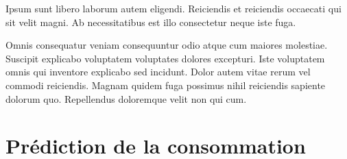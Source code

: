 \documentclass[a4paper]{article}
\begin{document}
\begin{multicols}{2}
Ipsum sunt libero laborum autem eligendi. Reiciendis et reiciendis occaecati qui
sit velit magni. Ab necessitatibus est illo consectetur neque iste fuga.

Omnis consequatur veniam consequuntur odio atque cum maiores molestiae. Suscipit
explicabo voluptatem voluptates dolores excepturi. Iste voluptatem omnis qui
inventore explicabo sed incidunt. Dolor autem vitae rerum vel commodi
reiciendis. Magnam quidem fuga possimus nihil reiciendis sapiente dolorum quo.
Repellendus doloremque velit non qui cum.

\end{multicols}

\clearpage
\section{Prédiction de la consommation}
\end{document}
